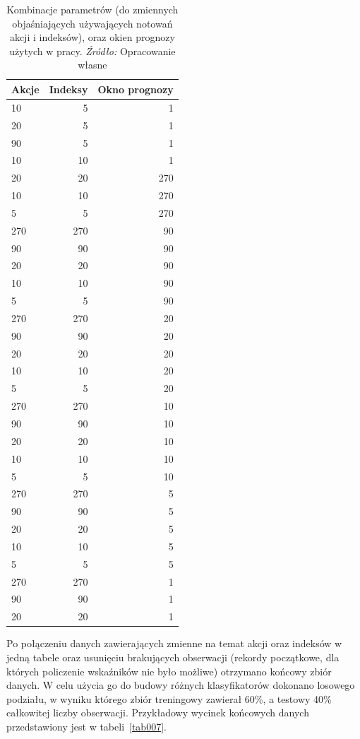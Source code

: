 \documentclass[12pt,a4paper,twoside,openany]{book}
\begin{document}
\begin{table}[ht] 
\caption{Kombinacje parametrów (do zmiennych objaśniających używających notowań akcji i indeksów), oraz okien prognozy użytych w pracy. \textit{Źródło:} Opracowanie własne}
\label{tab006}
\centering
\begin{tabular}{lrr}
  \hline
Akcje & Indeksy & Okno prognozy \\
  \hline
10 & 5 & 1 \\ 
  20 & 5 & 1 \\ 
  90 & 5 & 1 \\ 
  10 & 10 & 1 \\ 
  20 & 20 & 270 \\ 
  10 & 10 & 270 \\ 
  5 & 5 & 270 \\ 
  270 & 270 & 90 \\ 
  90 & 90 & 90 \\ 
  20 & 20 & 90 \\ 
  10 & 10 & 90 \\ 
  5 & 5 & 90 \\ 
  270 & 270 & 20 \\ 
  90 & 90 & 20 \\ 
  20 & 20 & 20 \\ 
  10 & 10 & 20 \\ 
  5 & 5 & 20 \\ 
  270 & 270 & 10 \\ 
  90 & 90 & 10 \\ 
  20 & 20 & 10 \\ 
  10 & 10 & 10 \\ 
  5 & 5 & 10 \\ 
  270 & 270 & 5 \\ 
  90 & 90 & 5 \\ 
  20 & 20 & 5 \\ 
  10 & 10 & 5 \\ 
  5 & 5 & 5 \\ 
  270 & 270 & 1 \\ 
  90 & 90 & 1 \\ 
  20 & 20 & 1 \\ 
   \hline
\end{tabular}
\end{table}

Po połączeniu danych zawierających zmienne na temat akcji oraz indeksów w jedną tabele oraz usunięciu brakujących obserwacji (rekordy początkowe, dla których policzenie wskaźników nie było możliwe) otrzymano końcowy zbiór danych. W celu użycia go do budowy różnych klasyfikatorów dokonano losowego podziału, w wyniku którego zbiór treningowy zawierał 60\%, a testowy 40\% całkowitej liczby obserwacji. Przykładowy wycinek końcowych danych przedstawiony jest w tabeli~\ref{tab007}.
\end{document}
